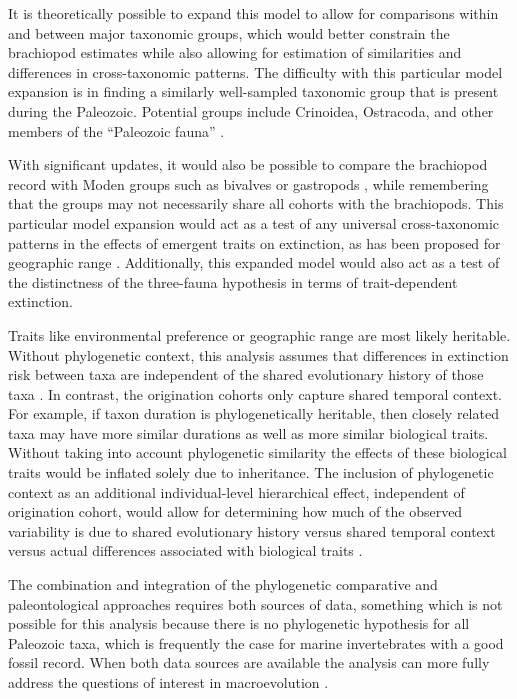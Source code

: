 \documentclass[11pt]{article}
\begin{document}
It is theoretically possible to expand this model to allow for comparisons within and between major taxonomic groups, which would better constrain the brachiopod estimates while also allowing for estimation of similarities and differences in cross-taxonomic patterns. The difficulty with this particular model expansion is in finding a similarly well-sampled taxonomic group that is present during the Paleozoic. Potential groups include Crinoidea, Ostracoda, and other members of the ``Paleozoic fauna'' \citep{Sepkoski1981a}.

With significant updates, it would also be possible to compare the brachiopod record with Moden groups such as bivalves or gastropods \citep{Sepkoski1981a}, while remembering that the groups may not necessarily share all cohorts with the brachiopods. This particular model expansion would act as a test of any universal cross-taxonomic patterns in the effects of emergent traits on extinction, as has been proposed for geographic range \citep{Payne2007}. Additionally, this expanded model would also act as a test of the distinctness of the \citet{Sepkoski1981a} three-fauna hypothesis in terms of trait-dependent extinction.

Traits like environmental preference or geographic range \citep{Jablonski1987,Hunt2005b} are most likely heritable. Without phylogenetic context, this analysis assumes that differences in extinction risk between taxa are independent of the shared evolutionary history of those  taxa \citep{Felsenstein1985b}. In contrast, the origination cohorts only capture shared temporal context. For example, if taxon duration is phylogenetically heritable, then closely related taxa may have more similar durations as well as more similar biological traits. Without taking into account phylogenetic similarity the effects of these biological traits would be inflated solely due to inheritance. The inclusion of phylogenetic context as an additional individual-level hierarchical effect, independent of origination cohort, would allow for determining how much of the observed variability is due to shared evolutionary history versus shared temporal context versus actual differences associated with biological traits \citep{Smits2015}.

The combination and integration of the phylogenetic comparative and paleontological approaches requires both sources of data, something which is not possible for this analysis because there is no phylogenetic hypothesis for all Paleozoic taxa, which is frequently the case for marine invertebrates with a good fossil record. When both data sources are available the analysis can more fully address the questions of interest in macroevolution \citep{Smits2015,Slater2013a,Slater2015b,Simpson2011,Tomiya2013,Slater2012,Raia2013c,Raia2012f,Harnik2014,Fritz2013a}.
\end{document}
